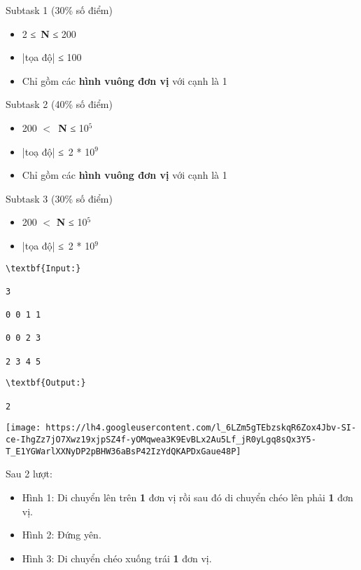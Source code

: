Subtask 1 (30\% số điểm)
\begin{itemize}
	\item 2 ≤ \textbf{N} ≤ 200
	\item |tọa độ| ≤ 100
	\item Chỉ gồm các \textbf{hình vuông đơn vị} với cạnh là 1
\end{itemize}

Subtask 2 (40\% số điểm)
\begin{itemize}
	\item 200 $<$ \textbf{N} ≤ 10$^5$
	\item |toạ độ| ≤ 2 * 10$^9$
	\item Chỉ gồm các \textbf{hình vuông đơn vị} với cạnh là 1
\end{itemize}

Subtask 3 (30\% số điểm)
\begin{itemize}
	\item 200 $<$ \textbf{N} ≤ 10$^5$
	\item |tọa độ| ≤ 2 * 10$^9$
\end{itemize}
\begin{verbatim}
\textbf{Input:}

3

0 0 1 1

0 0 2 3

2 3 4 5\end{verbatim}
\begin{verbatim}
\textbf{Output:}

2\end{verbatim}
\texttt{[image: https://lh4.googleusercontent.com/l\_6LZm5gTEbzskqR6Zox4Jbv-SI-ce-IhgZz7jO7Xwz19xjpSZ4f-yOMqwea3K9EvBLx2Au5Lf\_jR0yLgq8sQx3Y5-T\_E1YGWarlXXNyDP2pBHW36aBsP42IzYdQKAPDxGaue48P]}

Sau 2 lượt:
\begin{itemize}
	\item Hình 1: Di chuyển lên trên \textbf{1} đơn vị rồi sau đó di chuyển chéo lên phải \textbf{1} đơn vị.
	\item Hình 2: Đứng yên.
	\item Hình 3: Di chuyển chéo xuống trái \textbf{1} đơn vị.
\end{itemize}
